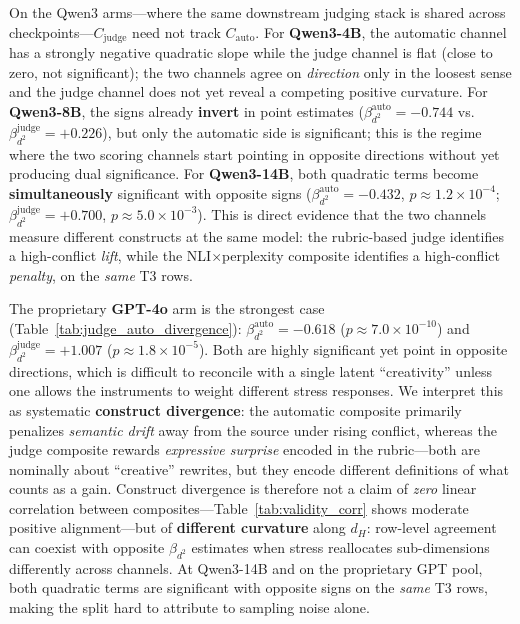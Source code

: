 \documentclass[sigconf,nonacm]{acmart}
\begin{document}
On the Qwen3 arms---where the same downstream judging stack is shared across checkpoints---$C_{\mathrm{judge}}$ need not track $C_{\mathrm{auto}}$.
For \textbf{Qwen3-4B}, the automatic channel has a strongly negative quadratic slope while the judge channel is flat (close to zero, not significant); the two channels agree on \emph{direction} only in the loosest sense and the judge channel does not yet reveal a competing positive curvature.
For \textbf{Qwen3-8B}, the signs already \textbf{invert} in point estimates ($\beta_{d^2}^{\mathrm{auto}}{=}{-}0.744$ vs.\ $\beta_{d^2}^{\mathrm{judge}}{=}{+}0.226$), but only the automatic side is significant; this is the regime where the two scoring channels start pointing in opposite directions without yet producing dual significance.
For \textbf{Qwen3-14B}, both quadratic terms become \textbf{simultaneously} significant with opposite signs ($\beta_{d^2}^{\mathrm{auto}}{=}{-}0.432$, $p{\approx}1.2{\times}10^{-4}$; $\beta_{d^2}^{\mathrm{judge}}{=}{+}0.700$, $p{\approx}5.0{\times}10^{-3}$). This is direct evidence that the two channels measure different constructs at the same model: the rubric-based judge identifies a high-conflict \emph{lift}, while the NLI$\times$perplexity composite identifies a high-conflict \emph{penalty}, on the \emph{same} T3 rows.

The proprietary \textbf{GPT-4o} arm is the strongest case (Table~\ref{tab:judge_auto_divergence}): $\beta_{d^2}^{\mathrm{auto}}{=}{-}0.618$ ($p{\approx}7.0{\times}10^{-10}$) and $\beta_{d^2}^{\mathrm{judge}}{=}{+}1.007$ ($p{\approx}1.8{\times}10^{-5}$).
Both are highly significant yet point in opposite directions, which is difficult to reconcile with a single latent ``creativity'' unless one allows the instruments to weight different stress responses.
We interpret this as systematic \textbf{construct divergence}: the automatic composite primarily penalizes \emph{semantic drift} away from the source under rising conflict, whereas the judge composite rewards \emph{expressive surprise} encoded in the rubric---both are nominally about ``creative'' rewrites, but they encode different definitions of what counts as a gain.
Construct divergence is therefore not a claim of \emph{zero} linear correlation between composites---Table~\ref{tab:validity_corr} shows moderate positive alignment---but of \textbf{different curvature} along $d_H$: row-level agreement can coexist with opposite $\beta_{d^2}$ estimates when stress reallocates sub-dimensions differently across channels.
At Qwen3-14B and on the proprietary GPT pool, both quadratic terms are significant with opposite signs on the \emph{same} T3 rows, making the split hard to attribute to sampling noise alone.
\end{document}
